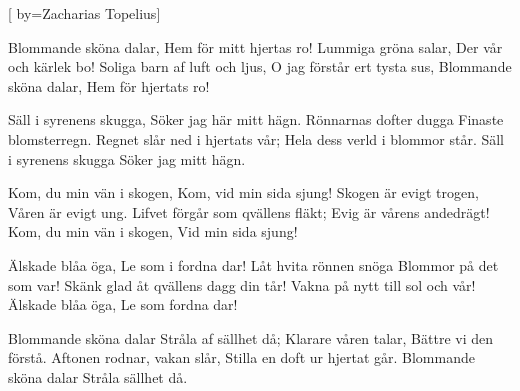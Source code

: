 


[ 	%
	by={Zacharias Topelius}]		%
	
\beginverse*		%
Blommande sköna dalar,
Hem för mitt hjertas ro! 
Lummiga gröna salar,
Der vår och kärlek bo! 
Soliga barn af luft och ljus, 
O jag förstår ert tysta sus, 
Blommande sköna dalar,
Hem för hjertats ro!
\endverse			%

\beginverse*		%
Säll i syrenens skugga,
Söker jag här mitt hägn. 
Rönnarnas dofter dugga
Finaste blomsterregn. 
Regnet slår ned i hjertats vår; 
Hela dess verld i blommor står. 
Säll i syrenens skugga
Söker jag mitt hägn.
\endverse			%

\beginverse*		%
Kom, du min vän i skogen,
Kom, vid min sida sjung!
Skogen är evigt trogen,
Våren är evigt ung.
Lifvet förgår som qvällens fläkt;
Evig är vårens andedrägt!
Kom, du min vän i skogen,
Vid min sida sjung!
\endverse			%

\beginverse*		%
Älskade blåa öga,
Le som i fordna dar!
Låt hvita rönnen snöga
Blommor på det som var!
Skänk glad åt qvällens dagg din tår!
Vakna på nytt till sol och vår!
Älskade blåa öga,
Le som fordna dar!
\endverse			%

\beginverse*		%
Blommande sköna dalar
Stråla af sällhet då;
Klarare våren talar,
Bättre vi den förstå.
Aftonen rodnar, vakan slår,
Stilla en doft ur hjertat går.
Blommande sköna dalar
Stråla sällhet då.
\endverse			%
\endsong			%

